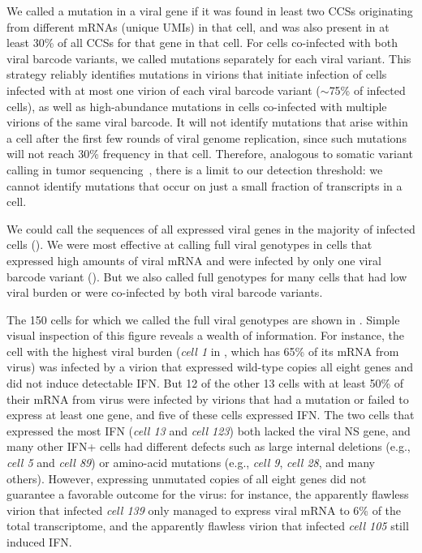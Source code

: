 \documentclass[9pt,lineno]{elife}
\begin{document}
We called a mutation in a viral gene if it was found in least two CCSs originating from different mRNAs (unique UMIs) in that cell, and was also present in at least 30\% of all CCSs for that gene in that cell.
For cells co-infected with both viral barcode variants, we called mutations separately for each viral variant.
This strategy reliably identifies mutations in virions that initiate infection of cells infected with at most one virion of each viral barcode variant ($\sim$75\% of infected cells), as well as high-abundance mutations in cells co-infected with multiple virions of the same viral barcode.
It will not identify mutations that arise within a cell after the first few rounds of viral genome replication, since such mutations will not reach 30\% frequency in that cell.
Therefore, analogous to somatic variant calling in tumor sequencing~\citep{xu2014comparison, cibulskis2013sensitive}, there is a limit to our detection threshold: we cannot identify mutations that occur on just a small fraction of transcripts in a cell. 

We could call the sequences of all expressed viral genes in the majority of infected cells ().
We were most effective at calling full viral genotypes in cells that expressed high amounts of viral mRNA and were infected by only one viral barcode variant ().
But we also called full genotypes for many cells that had low viral burden or were co-infected by both viral barcode variants.

The 150 cells for which we called the full viral genotypes are shown in .
Simple visual inspection of this figure reveals a wealth of information.
For instance, the cell with the highest viral burden (\textit{cell 1} in , which has 65\% of its mRNA from virus) was infected by a virion that expressed wild-type copies all eight genes and did not induce detectable IFN.
But 12 of the other 13 cells with at least 50\% of their mRNA from virus were infected by virions that had a mutation or failed to express at least one gene, and five of these cells expressed IFN.
The two cells that expressed the most IFN (\textit{cell 13} and \textit{cell 123}) both lacked the viral NS gene, and many other IFN+ cells had different defects such as large internal deletions (e.g., \textit{cell 5} and \textit{cell 89}) or amino-acid mutations (e.g., \textit{cell 9}, \textit{cell 28}, and many others).
However, expressing unmutated copies of all eight genes did not guarantee a favorable outcome for the virus: for instance, the apparently flawless virion that infected \textit{cell 139} only managed to express viral mRNA to 6\% of the total transcriptome, and the apparently flawless virion that infected \textit{cell 105} still induced IFN.
\end{document}
